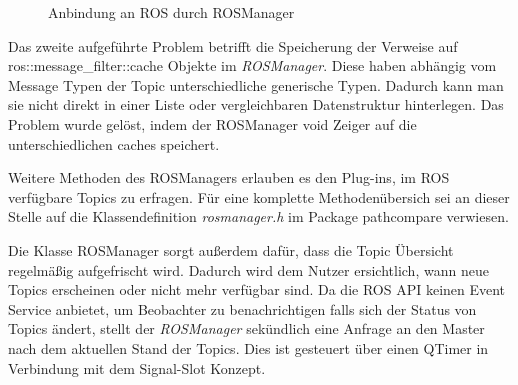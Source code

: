 \begin{figure}[t]
  \begin{center}
  \end{center}
  \caption{Anbindung an ROS durch ROSManager}
  \label{fig:rosmanager}
\end{figure}

Das zweite aufgeführte Problem betrifft die Speicherung der Verweise auf
ros::message\_filter::cache Objekte im \textit{ROSManager}. Diese haben
abhängig vom Message Typen der Topic unterschiedliche generische Typen. Dadurch
kann man sie nicht direkt in einer Liste oder vergleichbaren Datenstruktur
hinterlegen. Das Problem wurde gelöst, indem der ROSManager void Zeiger auf die
unterschiedlichen caches speichert.

Weitere Methoden des ROSManagers erlauben es den Plug-ins, im ROS verfügbare
Topics zu erfragen.
Für eine komplette Methodenübersich sei an dieser Stelle auf die
Klassendefinition \textit{rosmanager.h} im Package pathcompare verwiesen.

Die Klasse ROSManager sorgt außerdem dafür, dass die Topic Übersicht
regelmäßig aufgefrischt wird. Dadurch wird dem Nutzer ersichtlich, wann neue
Topics erscheinen oder nicht mehr verfügbar sind. Da die
ROS \gls{API} keinen Event Service anbietet, um Beobachter zu benachrichtigen
falls sich der Status von Topics ändert, stellt der
\textit{ROSManager} sekündlich eine Anfrage an den Master nach dem
aktuellen Stand der Topics. Dies ist gesteuert über einen QTimer in Verbindung
mit dem Signal-Slot Konzept.

